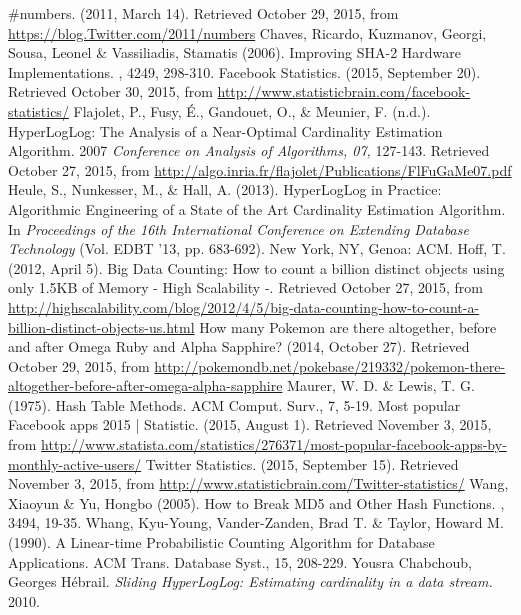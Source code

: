 \documentclass{article}
\begin{document}
\newpage
\begin{thebibliography}{9}
 \#numbers. (2011, March 14). Retrieved October 29, 2015, from \url{https://blog.Twitter.com/2011/numbers}
 Chaves, Ricardo, Kuzmanov, Georgi, Sousa, Leonel \& Vassiliadis, Stamatis (2006). Improving SHA-2 Hardware Implementations. , 4249, 298-310.
 Facebook Statistics. (2015, September 20). Retrieved October 30, 2015, from \url{http://www.statisticbrain.com/facebook-statistics/}
 Flajolet, P., Fusy, \'E., Gandouet, O., \& Meunier, F. (n.d.). HyperLogLog: The Analysis of a Near-Optimal Cardinality Estimation Algorithm. 2007 \textit{Conference on Analysis of Algorithms, 07,} 127-143. Retrieved October 27, 2015, from \url{http://algo.inria.fr/flajolet/Publications/FlFuGaMe07.pdf}
 Heule, S., Nunkesser, M., \& Hall, A. (2013). HyperLogLog in Practice: Algorithmic Engineering of a State of the Art Cardinality Estimation Algorithm. In \textit{Proceedings of the 16th International Conference on Extending Database Technology} (Vol. EDBT '13, pp. 683-692). New York, NY, Genoa: ACM.
 Hoff, T. (2012, April 5). Big Data Counting: How to count a billion distinct objects using only 1.5KB of Memory - High Scalability -. Retrieved October 27, 2015, from \url{http://highscalability.com/blog/2012/4/5/big-data-counting-how-to-count-a-billion-distinct-objects-us.html}
 How many Pokemon are there altogether, before and after Omega Ruby and Alpha Sapphire? (2014, October 27). Retrieved October 29, 2015, from \url{http://pokemondb.net/pokebase/219332/pokemon-there-altogether-before-after-omega-alpha-sapphire}
 Maurer, W. D. \& Lewis, T. G. (1975). Hash Table Methods. ACM Comput. Surv., 7, 5-19.
 Most popular Facebook apps 2015 | Statistic. (2015, August 1). Retrieved November 3, 2015, from \url{http://www.statista.com/statistics/276371/most-popular-facebook-apps-by-monthly-active-users/}
 Twitter Statistics. (2015, September 15). Retrieved November 3, 2015, from \url{http://www.statisticbrain.com/Twitter-statistics/}
 Wang, Xiaoyun \& Yu, Hongbo (2005). How to Break MD5 and Other Hash Functions. , 3494, 19-35.
 Whang, Kyu-Young, Vander-Zanden, Brad T. \& Taylor, Howard M. (1990). A Linear-time Probabilistic Counting Algorithm for Database Applications. ACM Trans. Database Syst., 15, 208-229.
Yousra Chabchoub, Georges H\'ebrail. \textit{Sliding HyperLogLog: Estimating cardinality in a data stream.} 2010. 
\end{thebibliography}
\end{document}

